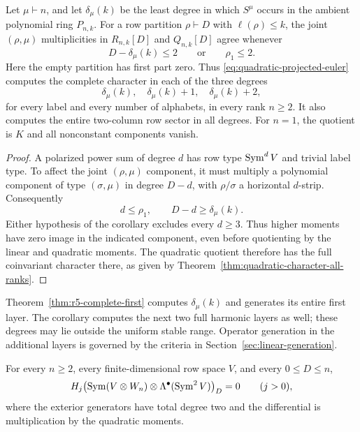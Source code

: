 \begin{samepage}
\begin{corollary}
\label{cor:first-three-character-layers}
Let $\mu\vdash n$, and let $\delta_\mu(k)$ be the least degree
in which $S^\mu$ occurs in the ambient polynomial ring $P_{n,k}$.
For a row partition $\rho\vdash D$ with $\ell(\rho)\le k$, the
joint $(\rho,\mu)$ multiplicities in $R_{n,k}[D]$ and $Q_{n,k}[D]$
agree whenever
\[
 D-\delta_\mu(k)\le2\qquad\text{or}\qquad\rho_1\le2.
\]
Here the empty partition has first part zero. Thus
\eqref{eq:quadratic-projected-euler} computes the complete character
in each of the three degrees
\[
 \delta_\mu(k),\quad\delta_\mu(k)+1,\quad\delta_\mu(k)+2,
\]
for every label and every number of alphabets, in every rank $n\ge2$.
It also computes the entire two-column row sector in all degrees.
For $n=1$, the quotient is $K$ and all nonconstant components vanish.
\end{corollary}
\end{samepage}
\begin{proof}
A polarized power sum of degree $d$ has row type $\operatorname{Sym}^dV$ and trivial label
type. To affect the joint $(\rho,\mu)$ component, it must multiply
a polynomial component of type $(\sigma,\mu)$ in degree $D-d$,
with $\rho/\sigma$ a horizontal $d$-strip. Consequently
\[
 d\le\rho_1,\qquad D-d\ge\delta_\mu(k).
\]
Either hypothesis of the corollary excludes every $d\ge3$. Thus higher
moments have zero image in the indicated component, even before
quotienting by the linear and quadratic moments. The quadratic
quotient therefore has the full coinvariant character there, as
given by Theorem~\ref{thm:quadratic-character-all-ranks}.
\end{proof}

Theorem~\ref{thm:r5-complete-first} computes $\delta_\mu(k)$ and
generates its entire first layer. The corollary computes the next
two full harmonic layers as well; these degrees may lie outside
the uniform stable range. Operator generation in the additional
layers is governed by the criteria in Section~\ref{sec:linear-generation}.

\begin{theorem}
\label{thm:quadratic-koszul-degree-range}
For every $n\ge2$, every finite-dimensional row space $V$, and
every $0\le D\le n$,
\begin{equation}\label{eq:quadratic-koszul-degree-range}
 H_j\!\left(\operatorname{Sym}(V\otimes W_n)
                 \otimes\Lambda^\bullet(\operatorname{Sym}^2V)\right)_D=0
                 \qquad(j>0),
\end{equation}
where the exterior generators have total degree two and the
differential is multiplication by the quadratic moments.
\end{theorem}


